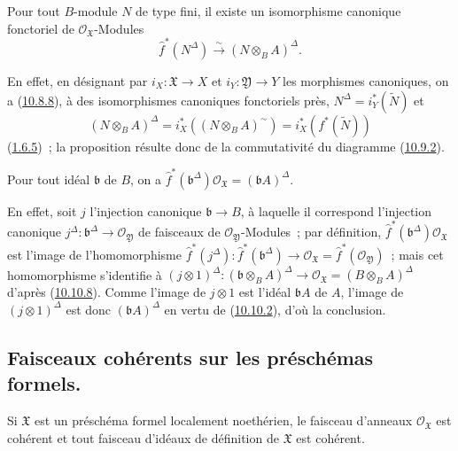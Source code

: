 \begin{proposition}[10.10.8]
\label{I.10.10.8-fr}
Pour tout $B$-module $N$ de type fini, il existe un isomorphisme
canonique fonctoriel de $\mathscr{O}_{\mathfrak{X}}$-Modules
\[
  \widehat f^*(N^\Delta)
  \xrightarrow{\sim}
  (N\otimes_B A)^\Delta.
\]
\end{proposition}

En effet, en désignant par $i_X:\mathfrak{X}\to X$ et
$i_Y:\mathfrak{Y}\to Y$ les morphismes canoniques, on a
(\hyperref[I.10.8.8-fr]{10.8.8}), à des isomorphismes canoniques
fonctoriels près, $N^\Delta=i_Y^*(\widetilde N)$ et
\[
  (N\otimes_B A)^\Delta
  =i_X^*((N\otimes_B A)^{\sim})
  =i_X^*(f^*(\widetilde N))
\]
(\hyperref[I.1.6.5-fr]{1.6.5})~; la proposition résulte donc de la
commutativité du diagramme (\hyperref[I.10.9.2-fr]{10.9.2}).

\begin{corollary}[10.10.9]
\label{I.10.10.9-fr}
Pour tout idéal $\mathfrak b$ de $B$, on a
$\widehat f^*(\mathfrak b^\Delta)\mathscr{O}_{\mathfrak{X}}
=(\mathfrak bA)^\Delta$.
\end{corollary}

En effet, soit $j$ l'injection canonique $\mathfrak b\to B$, à laquelle
il correspond l'injection canonique
$j^\Delta:\mathfrak b^\Delta\to\mathscr{O}_{\mathfrak{Y}}$ de
faisceaux de $\mathscr{O}_{\mathfrak{Y}}$-Modules~; par définition,
$\widehat f^*(\mathfrak b^\Delta)\mathscr{O}_{\mathfrak{X}}$ est
l'image de l'homomorphisme
$\widehat f^*(j^\Delta):\widehat f^*(\mathfrak b^\Delta)\to
\mathscr{O}_{\mathfrak{X}}=\widehat f^*(\mathscr{O}_{\mathfrak{Y}})$~;
mais cet homomorphisme s'identifie à
$(j\otimes1)^\Delta:(\mathfrak b\otimes_B A)^\Delta\to
\mathscr{O}_{\mathfrak{X}}=(B\otimes_B A)^\Delta$ d'après
(\hyperref[I.10.10.8-fr]{10.10.8}). Comme l'image de $j\otimes1$ est
l'idéal $\mathfrak bA$ de $A$, l'image de $(j\otimes1)^\Delta$ est
donc $(\mathfrak bA)^\Delta$ en vertu de
(\hyperref[I.10.10.2-fr]{10.10.2}), d'où la conclusion.

\subsection{Faisceaux cohérents sur les préschémas formels.}
\label{subsection:I.10.11-fr}

\begin{proposition}[10.11.1]
\label{I.10.11.1-fr}
Si $\mathfrak{X}$ est un préschéma formel localement noethérien, le
faisceau d'anneaux $\mathscr{O}_{\mathfrak{X}}$ est cohérent et tout
faisceau d'idéaux de définition de $\mathfrak{X}$ est cohérent.
\end{proposition}

